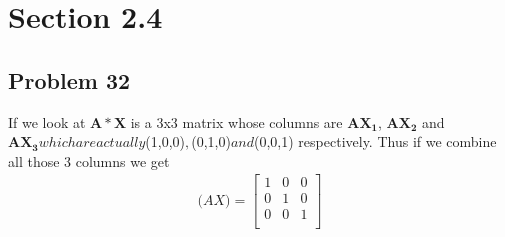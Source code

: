 \documentclass[a4paper,11pt]{article}
\newcommand{\mybf}[1]{\boldsymbol{#1}}
\begin{document}
\section*{Section 2.4}
\subsection*{Problem 32}
If we look at
$\mybf{A*X}$ is a 3x3 matrix whose columns are $\mybf{AX_1}$, $\mybf{AX_2}$ and $\mybf{AX_3} which are actually $(1,0,0)$, $(0,1,0)$ and $(0,0,1) respectively. Thus if we combine all those 3 columns we get 
\begin{align}
\mybf(AX) =
\begin{bmatrix} 
    1 & 0 & 0 \\
    0 & 1 & 0\\
    0 & 0 & 1\\ 
\end{bmatrix}
\end{align}
\end{document}
